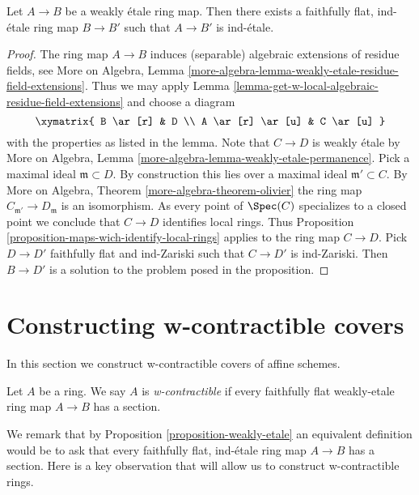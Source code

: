 \begin{proposition}
\label{proposition-weakly-etale}
Let $A \to B$ be a weakly \'etale ring map.
Then there exists a faithfully flat, ind-\'etale ring map
$B \to B'$ such that $A \to B'$ is ind-\'etale.
\end{proposition}

\begin{proof}
The ring map $A \to B$ induces (separable) algebraic extensions of
residue fields, see More on Algebra, Lemma
\ref{more-algebra-lemma-weakly-etale-residue-field-extensions}.
Thus we may apply
Lemma \ref{lemma-get-w-local-algebraic-residue-field-extensions}
and choose a diagram
$$
\xymatrix{
B \ar[r] & D \\
A \ar[r] \ar[u] & C \ar[u]
}
$$
with the properties as listed in the lemma. Note that $C \to D$
is weakly \'etale by
More on Algebra, Lemma \ref{more-algebra-lemma-weakly-etale-permanence}.
Pick a maximal ideal $\mathfrak m \subset D$. By construction
this lies over a maximal ideal $\mathfrak m' \subset C$.
By More on Algebra, Theorem \ref{more-algebra-theorem-olivier}
the ring map $C_{\mathfrak m'} \to D_\mathfrak m$ is an isomorphism.
As every point of $\Spec(C)$ specializes to a closed point we conclude that
$C \to D$ identifies local rings.
Thus Proposition \ref{proposition-maps-wich-identify-local-rings}
applies to the ring map $C \to D$. Pick $D \to D'$ faithfully flat
and ind-Zariski such that $C \to D'$ is ind-Zariski. Then
$B \to D'$ is a solution to the problem posed in the proposition.
\end{proof}








\section{Constructing w-contractible covers}
\label{section-w-contractible}

\noindent
In this section we construct w-contractible covers of affine schemes.

\begin{definition}
\label{definition-w-contractible}
Let $A$ be a ring. We say $A$ is {\it w-contractible} if every
faithfully flat weakly-etale ring map $A \to B$ has a section.
\end{definition}

\noindent
We remark that by Proposition \ref{proposition-weakly-etale}
an equivalent definition would be to ask that every faithfully
flat, ind-\'etale ring map $A \to B$ has a section.
Here is a key observation that will allow us to construct
w-contractible rings.

